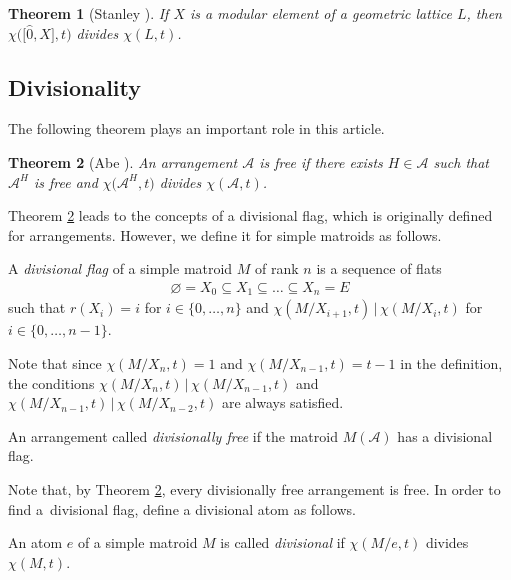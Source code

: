 \documentclass[11pt]{article}
\newtheorem{Theorem}{Theorem}[section]
\begin{document}
\begin{Theorem}[Stanley {\cite[Theorem 2]{stanley1971modular-au}}]\label{stanley division}
If $ X $ is a modular element of a geometric lattice $ L $, then $ \chi\big(\big[\hat{0},X\big],t\big) $ divides $ \chi(L,t) $.
\end{Theorem}

\subsection{Divisionality}

The following theorem plays an important role in this article.
\begin{Theorem}[Abe {\cite[Theorem 1.1 (division theorem)]{abe2016divisionally-im}}]\label{Abe division}
An arrangement $ \mathcal{A} $ is free if there exists $ H \in \mathcal{A} $ such that $ \mathcal{A}^{H} $ is free and $ \chi\big(\mathcal{A}^{H},t\big) $ divides $ \chi(\mathcal{A},t) $.
\end{Theorem}

Theorem \ref{Abe division} leads to the concepts of a divisional flag, which is originally defined for arrangements.
However, we define it for simple matroids as follows.

\begin{Definition}\label{definition divisional flag}
A \textit{divisional flag} of a simple matroid $ M $ of rank $ n $ is a sequence of flats \begin{align*}
\varnothing = X_{0} \subseteq X_{1} \subseteq \dots \subseteq X_{n} = E
\end{align*}
such that $ r(X_{i}) = i $ for $ i \in \{0, \dots, n \} $ and $ \chi(M/X_{i+1},t) \,|\, \chi(M/X_{i}, t) $ for $ i \in \{0, \dots, n-1 \} $.
\end{Definition}
Note that since $ \chi(M/X_{n},t)=1 $ and $ \chi(M/X_{n-1},t) = t-1 $ in the definition, the conditions $ \chi(M/X_{n},t) \,|\, \chi(M/X_{n-1},t) $ and $ \chi(M/X_{n-1},t) \,|\, \chi(M/X_{n-2},t) $ are always satisfied.

\begin{Definition}\label{definition divisional freeness}
An arrangement called \textit{divisionally free} if the matroid $ M(\mathcal{A}) $ has a divisional flag.
\end{Definition}
Note that, by Theorem \ref{Abe division}, every divisionally free arrangement is free. In order to find a~divisional flag, define a divisional atom as follows.

\begin{Definition}An atom $ e $ of a simple matroid $ M $ is called \textit{divisional} if $ \chi(M/e,t) $ divides $ \chi(M,t) $.
\end{Definition}
\end{document}
